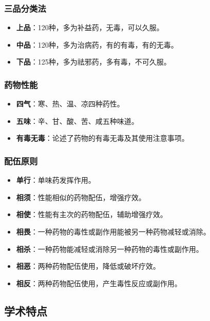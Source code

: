 \documentclass[12pt,UTF8]{ctexbook}
\begin{document}
\subsubsection{三品分类法}

\begin{itemize}
\item \textbf{上品}：120种，多为补益药，无毒，可以久服。
\item \textbf{中品}：120种，多为治病药，有的有毒，有的无毒。
\item \textbf{下品}：125种，多为祛邪药，多有毒，不可久服。
\end{itemize}

\subsubsection{药物性能}

\begin{itemize}
\item \textbf{四气}：寒、热、温、凉四种药性。
\item \textbf{五味}：辛、甘、酸、苦、咸五种味道。
\item \textbf{有毒无毒}：论述了药物的有毒无毒及其使用注意事项。
\end{itemize}

\subsubsection{配伍原则}

\begin{itemize}
\item \textbf{单行}：单味药发挥作用。
\item \textbf{相须}：性能相似的药物配伍，增强疗效。
\item \textbf{相使}：性能有主次的药物配伍，辅助增强疗效。
\item \textbf{相畏}：一种药物的毒性或副作用能被另一种药物减轻或消除。
\item \textbf{相杀}：一种药物能减轻或消除另一种药物的毒性或副作用。
\item \textbf{相恶}：两种药物配伍使用，降低或破坏疗效。
\item \textbf{相反}：两种药物配伍使用，产生毒性反应或副作用。
\end{itemize}

\subsection{学术特点}
\end{document}
